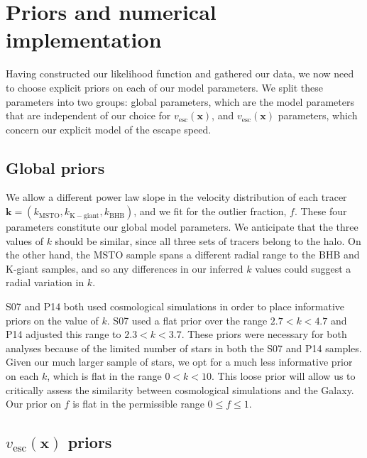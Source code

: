 \documentclass[useAMS,twocolumn,usenatbib]{mn2e}
\def\vesc{{v_\mathrm{esc}}}
\def\pos{{\boldsymbol{x}}}
\begin{document}
\section{Priors and numerical implementation}

\label{sec:pannm}

Having constructed our likelihood function and gathered our data, we now need to choose explicit priors on each of our model parameters. 
We split these parameters into two groups: global parameters, which are the model parameters that are independent of our choice for $\vesc(\pos)$, and $\vesc(\pos)$ parameters, which concern our explicit model of the escape speed.

\subsection{Global priors}
We allow a different power law slope in the velocity distribution of each tracer $\boldsymbol{k} = (k_\mathrm{MSTO},k_\mathrm{K-giant},k_\mathrm{BHB})$, and we fit for the outlier fraction, $f$.
These four parameters constitute our global model parameters. 
We anticipate that the three values of $k$ should be similar, since all three sets of tracers belong to the halo.
On the other hand, the MSTO sample spans a different radial range to the BHB and K-giant samples, and so any differences in our inferred $k$ values could suggest a radial variation in $k$.

S07 and P14 both used cosmological simulations in order to place informative priors on the value of $k$. 
S07 used a flat prior over the range $2.7 < k < 4.7$ and P14 adjusted this range to $2.3 < k < 3.7$. 
These priors were necessary for both analyses because of the limited number of stars in both the S07 and P14 samples. 
Given our much larger sample of stars, we opt for a much less informative prior on each $k$, which is flat in the range $0 < k < 10$. 
This loose prior will allow us to critically assess the similarity between cosmological simulations and the Galaxy. 
Our prior on $f$ is flat in the permissible range $0 \leq f \leq 1$.

\subsection{$\vesc(\pos)$ priors}
\end{document}
